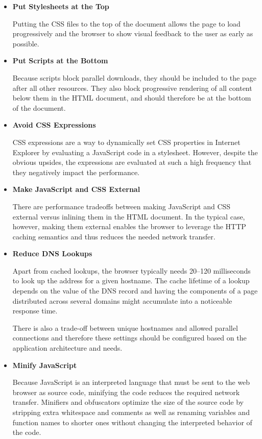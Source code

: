 \begin{itemize}
\item \textbf{Put Stylesheets at the Top}

  Putting the CSS files to the top of the document allows the page to
  load progressively and the browser to show visual feedback to the
  user as early as possible.

\item \textbf{Put Scripts at the Bottom}

  Because scripts block parallel downloads, they should be included to
  the page after all other resources. They also block progressive
  rendering of all content below them in the HTML document, and should
  therefore be at the bottom of the document.

\item \textbf{Avoid CSS Expressions}

  CSS expressions are a way to dynamically set CSS properties in
  Internet Explorer by evaluating a JavaScript code in a
  stylesheet. However, despite the obvious upsides, the expressions
  are evaluated at such a high frequency that they negatively impact
  the performance.

\item \textbf{Make JavaScript and CSS External}

  There are performance tradeoffs between making JavaScript and CSS
  external versus inlining them in the HTML document. In the typical
  case, however, making them external enables the browser to leverage
  the HTTP caching semantics and thus reduces the needed network
  transfer.

\item \textbf{Reduce DNS Lookups}

  Apart from cached  lookups, the browser typically needs
  20--120 milliseconds to look up the  address for a given
  hostname. The cache lifetime of a lookup depends on the 
  value of the DNS record and having the components of a page
  distributed across several domains might accumulate into a
  noticeable response time.

  There is also a trade-off between unique hostnames and allowed
  parallel connections and therefore these settings should be
  configured based on the application architecture and needs.

\item \textbf{Minify JavaScript}

  Because JavaScript is an interpreted language that must be sent to
  the web browser as source code, minifying the code reduces the
  required network transfer. Minifiers and obfuscators optimize the
  size of the source code by stripping extra whitespace and comments
  as well as renaming variables and function names to shorter ones
  without changing the interpreted behavior of the code.


\end{itemize}
